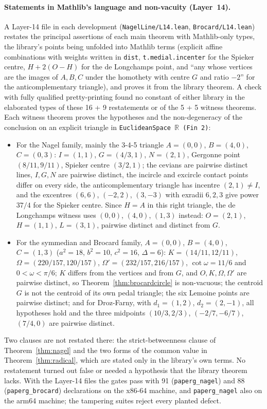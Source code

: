 \documentclass[11pt]{article}
\theoremstyle{definition}
\theoremstyle{remark}
\newcommand{\lean}[1]{\texttt{#1}}
\begin{document}
\paragraph{Statements in Mathlib's language and non-vacuity (Layer~14).} A Layer-14 file in each
development (\lean{NagelLine/L14.lean}, \lean{Brocard/L14.lean}) restates the principal assertions of each main theorem with
Mathlib-only types, the library's points being unfolded into Mathlib terms (explicit affine
combinations with weights written in \lean{dist}, \lean{t.medial.incenter} for the Spieker centre,
$H+2(O-H)$ for the de Longchamps point, and ``any  whose vertices are the
images of $A,B,C$ under the homothety with centre $G$ and ratio $-2$'' for the anticomplementary
triangle), and proves it from the library theorem. A check with fully qualified pretty-printing found
no constant of either library in the elaborated types of these 16 + 9 restatements or of the 5 + 5
witness theorems. Each witness theorem proves the hypotheses and the non-degeneracy of the conclusion
on an explicit triangle in \lean{EuclideanSpace \(\mathbb{R}\) (Fin 2)}:
\begin{itemize}
\item For the Nagel family, mainly the 3-4-5 triangle $A=(0,0)$, $B=(4,0)$, $C=(0,3)$: $I=(1,1)$,
$G=(4/3,1)$, $N=(2,1)$, Gergonne point $(8/11,9/11)$, Spieker centre $(3/2,1)$; the cevians are
pairwise distinct lines, $I,G,N$ are pairwise distinct, the incircle and excircle contact points
differ on every side, the anticomplementary triangle has incentre $(2,1)\neq I$, and the excentres
$(6,6)$, $(-2,2)$, $(3,-3)$ with exradii $6,2,3$ give power $37/4$ for the Spieker centre. Since $H=A$ in
this right triangle, the de Longchamps witness uses $(0,0)$, $(4,0)$, $(1,3)$ instead: $O=(2,1)$,
$H=(1,1)$, $L=(3,1)$, pairwise distinct and distinct from $G$.
\item For the symmedian and Brocard family, $A=(0,0)$, $B=(4,0)$, $C=(1,3)$ ($a^2=18$, $b^2=10$,
$c^2=16$, $\Delta=6$): $K=(14/11,12/11)$, $\Omega=(220/157,120/157)$, $\Omega'=(232/157,216/157)$,
$\cot\omega=11/6$ and $0<\omega<\pi/6$; $K$ differs from the vertices and from $G$, and $O,K,\Omega,\Omega'$
are pairwise distinct, so Theorem~\ref{thm:brocardcircle} is non-vacuous; the centroid $G$ is not
the centroid of its own pedal triangle; the six Lemoine points are pairwise distinct; and for
Droz-Farny, with $d_1=(1,2)$, $d_2=(2,-1)$, all hypotheses hold and the three midpoints
$(10/3,2/3)$, $(-2/7,-6/7)$, $(7/4,0)$ are pairwise distinct.
\end{itemize}
Two clauses are not restated there: the strict-betweenness clause of Theorem~\ref{thm:nagel} and the
two forms of the common value in Theorem~\ref{thm:radical}, which are stated only in the library's own
terms. No restatement turned out false or needed a hypothesis that the library theorem lacks. With the
Layer-14 files the gates pass with 91 (\lean{paperg\_nagel}) and 88 (\lean{paperg\_brocard})
declarations on the x86-64 machine, and \lean{paperg\_nagel} also on the arm64 machine; the tampering
suites reject every planted defect.
\end{document}
